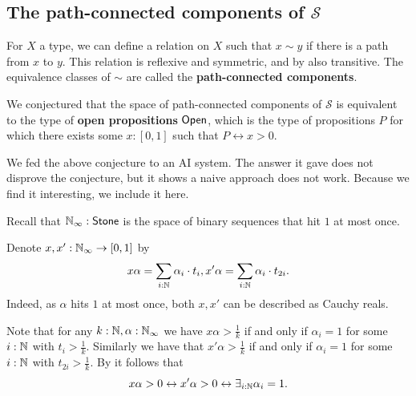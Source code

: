 \subsection{The path-connected components of $\mathcal S$}\label{PathConnectedcomponentsWeird}
\begin{remark}\label{PathConnectedComponents}
  For $X$ a type, we can define a relation on $X$ such that 
  $x\sim y$ if there is a path from $x$ to $y$. This relation is reflexive and symmetric, and by  also transitive.
  The equivalence classes of $\sim$ are called the \textbf{path-connected components}.

  We conjectured that the space of path-connected components of $\mathcal S$ is equivalent to the type of \textbf{open propositions} $\mathsf{Open}$, which is the type of propositions $P$ for which there exists some $x:[0,1]$ such that $P\leftrightarrow x>0$. 
\end{remark}
  We fed the above conjecture to an AI system. The answer it gave does not disprove the conjecture, but it shows a naive approach does not work. Because we find it interesting, we include it here. 
\begin{remark}
  Recall that $\mathbb{N}_{\infty}:\mathsf{Stone}$ is the space of binary sequences that hit $1$ at most once. 
\end{remark}
\begin{remark}
  Denote $x,x':\mathbb{N}_{\infty} \to [0,1]$ by $$x\alpha = \sum\limits_{i:\mathbb{N}} \alpha_i \cdot t_i, x'\alpha = \sum\limits_{i:\mathbb{N}}\alpha_i \cdot t_{2i}.$$ Indeed, as $\alpha$ hits $1$ at most once, both $x,x'$ can be described as Cauchy reals. 
\end{remark} 
\begin{remark}\label{sequenceAbove0Toghether}
  Note that for any $k:\mathbb{N},\alpha:\mathbb{N}_{\infty}$ we have $x\alpha>\frac1k$ if and only if $\alpha_i = 1$ for some $i:\mathbb{N}$ with $t_i>\frac1k$. 
  Similarly we have that $x'\alpha>\frac1k$ if and only if $\alpha_i = 1$ for some $i:\mathbb{N}$ with $t_{2i} >\frac1k$. 
By  it follows that $$x\alpha>0 \leftrightarrow x'\alpha>0\leftrightarrow \exists_{i:\mathbb{N}} \alpha_i = 1.$$
\end{remark}

